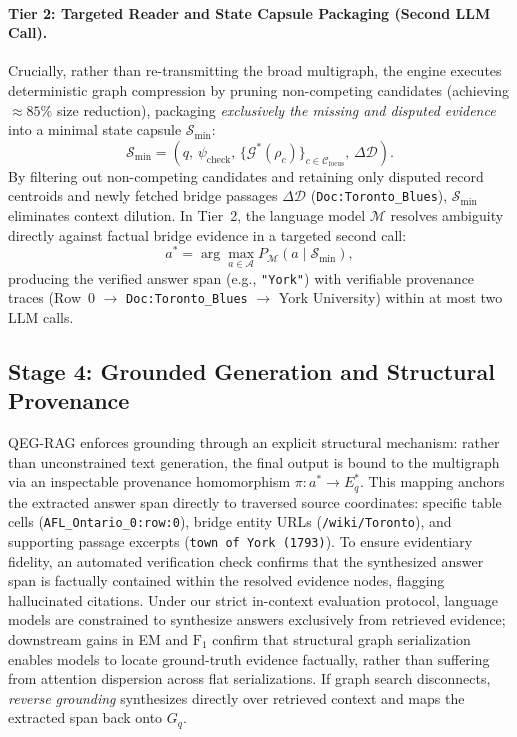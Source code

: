 \documentclass[runningheads]{llncs}
\begin{document}
\paragraph{Tier 2: Targeted Reader and State Capsule Packaging (Second LLM Call).}
Crucially, rather than re-transmitting the broad multigraph, the engine executes deterministic graph compression by pruning non-competing candidates (achieving $\approx 85\%$ size reduction), packaging \emph{exclusively the missing and disputed evidence} into a minimal state capsule $\mathcal{S}_{\min}$:
\begin{equation}
\label{eq:l2-capsule}
\mathcal{S}_{\min} = \left( q, \, \psi_{\text{check}}, \, \{ \mathcal{G}^*(\rho_c) \}_{c \in \mathcal{C}_{\text{focus}}}, \, \Delta \mathcal{D} \right).
\end{equation}
By filtering out non-competing candidates and retaining only disputed record centroids and newly fetched bridge passages $\Delta \mathcal{D}$ (\texttt{Doc:Toronto\_Blues}), $\mathcal{S}_{\min}$ eliminates context dilution. In Tier~2, the language model $\mathcal{M}$ resolves ambiguity directly against factual bridge evidence in a targeted second call:
\begin{equation}
a^* = \arg\max_{a \in \mathcal{A}} P_{\mathcal{M}}(a \mid \mathcal{S}_{\min}),
\end{equation}
producing the verified answer span (e.g., \texttt{"York"}) with verifiable provenance traces (Row~0 $\to$ \texttt{Doc:Toronto\_Blues} $\to$ York University) within at most two LLM calls.

\subsection{Stage 4: Grounded Generation and Structural Provenance}
\label{sec:method-answer}
QEG-RAG enforces grounding through an explicit structural mechanism: rather than unconstrained text generation, the final output is bound to the multigraph via an inspectable provenance homomorphism $\pi: a^* \rightarrow E_q^*$. This mapping anchors the extracted answer span directly to traversed source coordinates: specific table cells (\texttt{AFL\_Ontario\_0:row:0}), bridge entity URLs (\texttt{/wiki/Toronto}), and supporting passage excerpts (\texttt{town of York (1793)}). To ensure evidentiary fidelity, an automated verification check confirms that the synthesized answer span is factually contained within the resolved evidence nodes, flagging hallucinated citations. Under our strict in-context evaluation protocol, language models are constrained to synthesize answers exclusively from retrieved evidence; downstream gains in EM and $\text{F}_1$ confirm that structural graph serialization enables models to locate ground-truth evidence factually, rather than suffering from attention dispersion across flat serializations. If graph search disconnects, \emph{reverse grounding} synthesizes directly over retrieved context and maps the extracted span back onto $G_q$.
\end{document}
